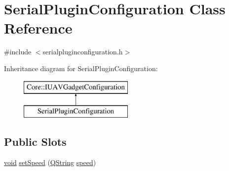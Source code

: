 \hypertarget{class_serial_plugin_configuration}{\section{\-Serial\-Plugin\-Configuration \-Class \-Reference}
\label{class_serial_plugin_configuration}
}


{\ttfamily \#include $<$serialpluginconfiguration.\-h$>$}

\-Inheritance diagram for \-Serial\-Plugin\-Configuration\-:\begin{figure}[H]
\begin{center}
\leavevmode
\includegraphics[height=2.000000cm]{class_serial_plugin_configuration}
\end{center}
\end{figure}
\subsection*{\-Public \-Slots}
\begin{DoxyCompactItemize}
\item 
\hyperlink{group___u_a_v_objects_plugin_ga444cf2ff3f0ecbe028adce838d373f5c}{void} \hyperlink{group___serial_plugin_ga6e476e94e24bb1f9bf91de3c99ff00fc}{set\-Speed} (\hyperlink{group___u_a_v_objects_plugin_gab9d252f49c333c94a72f97ce3105a32d}{\-Q\-String} \hyperlink{group___serial_plugin_ga1e6623a11c7e9c8e52411d2568dd4e7c}{speed})
\end{DoxyCompactItemize}
